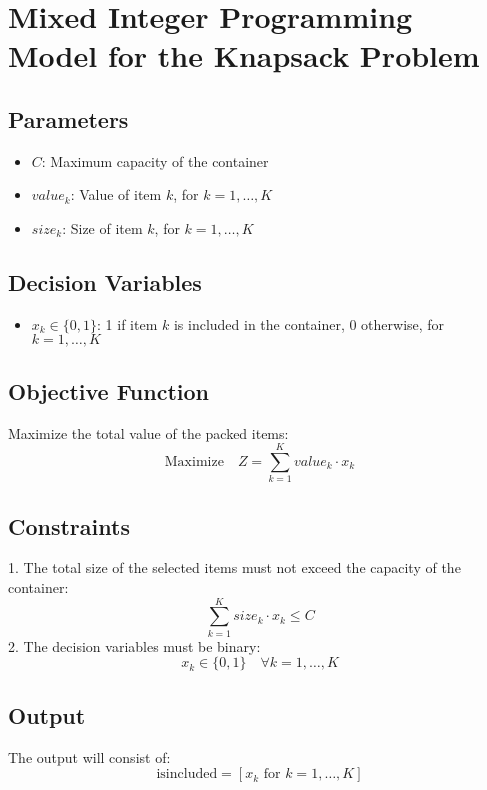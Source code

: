 \documentclass{article}
\begin{document}
\section*{Mixed Integer Programming Model for the Knapsack Problem}

\subsection*{Parameters}
\begin{itemize}
    \item $C$: Maximum capacity of the container
    \item $value_k$: Value of item $k$, for $k = 1, \ldots, K$
    \item $size_k$: Size of item $k$, for $k = 1, \ldots, K$
\end{itemize}

\subsection*{Decision Variables}
\begin{itemize}
    \item $x_k \in \{0, 1\}$: 1 if item $k$ is included in the container, 0 otherwise, for $k = 1, \ldots, K$
\end{itemize}

\subsection*{Objective Function}
Maximize the total value of the packed items:
\[
\text{Maximize} \quad Z = \sum_{k=1}^K value_k \cdot x_k
\]

\subsection*{Constraints}
1. The total size of the selected items must not exceed the capacity of the container:
\[
\sum_{k=1}^K size_k \cdot x_k \leq C
\]
2. The decision variables must be binary:
\[
x_k \in \{0, 1\} \quad \forall k = 1, \ldots, K
\]

\subsection*{Output}
The output will consist of:
\[
\text{isincluded} = [x_k \text{ for } k = 1, \ldots, K]
\]
\end{document}
